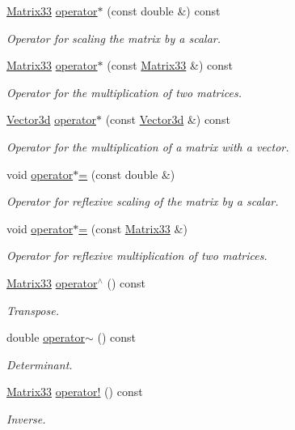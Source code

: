 \begin{DoxyCompactItemize}
\hyperlink{classMatrix33}{\-Matrix33} \hyperlink{classMatrix33_a6992fd2bb0b6e9ad71b5d3481c4e3e1a}{operator$\ast$} (const double \&) const 
\begin{DoxyCompactList}\small\item\em \-Operator for scaling the matrix by a scalar. \end{DoxyCompactList}\item 
\hyperlink{classMatrix33}{\-Matrix33} \hyperlink{classMatrix33_a525f14614255ff81c0cbab8060e8e065}{operator$\ast$} (const \hyperlink{classMatrix33}{\-Matrix33} \&) const 
\begin{DoxyCompactList}\small\item\em \-Operator for the multiplication of two matrices. \end{DoxyCompactList}\item 
\hyperlink{classVector3d}{\-Vector3d} \hyperlink{classMatrix33_a601584a1edbaae7c6a2a2874605d6f61}{operator$\ast$} (const \hyperlink{classVector3d}{\-Vector3d} \&) const 
\begin{DoxyCompactList}\small\item\em \-Operator for the multiplication of a matrix with a vector. \end{DoxyCompactList}\item 
void \hyperlink{classMatrix33_a83162791813bef030b1ceb5df3c5cae3}{operator$\ast$=} (const double \&)
\begin{DoxyCompactList}\small\item\em \-Operator for reflexive scaling of the matrix by a scalar. \end{DoxyCompactList}\item 
void \hyperlink{classMatrix33_ac3937bdeb034cc83b4adcad16cd58a26}{operator$\ast$=} (const \hyperlink{classMatrix33}{\-Matrix33} \&)
\begin{DoxyCompactList}\small\item\em \-Operator for reflexive multiplication of two matrices. \end{DoxyCompactList}\item 
\hyperlink{classMatrix33}{\-Matrix33} \hyperlink{classMatrix33_ad4ab7b9674a44a297502282e1993ef54}{operator$^\wedge$} () const 
\begin{DoxyCompactList}\small\item\em \-Transpose. \end{DoxyCompactList}\item 
double \hyperlink{classMatrix33_a15b37caa6ab0d9f4a9f0d95846abd675}{operator$\sim$} () const 
\begin{DoxyCompactList}\small\item\em \-Determinant. \end{DoxyCompactList}\item 
\hyperlink{classMatrix33}{\-Matrix33} \hyperlink{classMatrix33_a1b822a20343a26b3c9bb7fd5c1247f37}{operator!} () const 
\begin{DoxyCompactList}\small\item\em \-Inverse. \end{DoxyCompactList}\end{DoxyCompactItemize}
